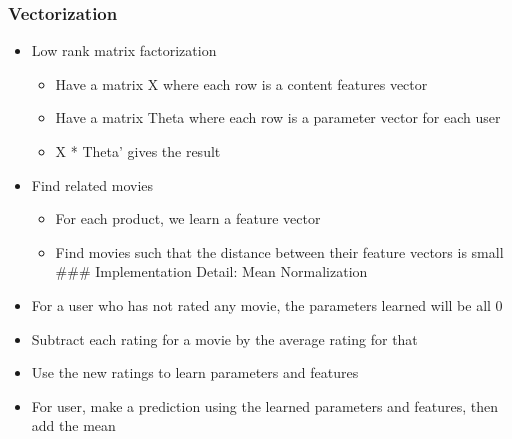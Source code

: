\documentclass[]{article}
\providecommand{\tightlist}{%
  \setlength{\itemsep}{0pt}\setlength{\parskip}{0pt}}
\begin{document}
\hypertarget{vectorization}{%
\subsubsection{Vectorization}\label{vectorization}}

\begin{itemize}
\tightlist
\item
  Low rank matrix factorization

  \begin{itemize}
  \tightlist
  \item
    Have a matrix X where each row is a content features vector
  \item
    Have a matrix Theta where each row is a parameter vector for each
    user
  \item
    X * Theta' gives the result
  \end{itemize}
\item
  Find related movies

  \begin{itemize}
  \tightlist
  \item
    For each product, we learn a feature vector
  \item
    Find movies such that the distance between their feature vectors is
    small \#\#\# Implementation Detail: Mean Normalization
  \end{itemize}
\item
  For a user who has not rated any movie, the parameters learned will be
  all 0
\item
  Subtract each rating for a movie by the average rating for that
\item
  Use the new ratings to learn parameters and features
\item
  For user, make a prediction using the learned parameters and features,
  then add the mean
\end{itemize}
\end{document}
